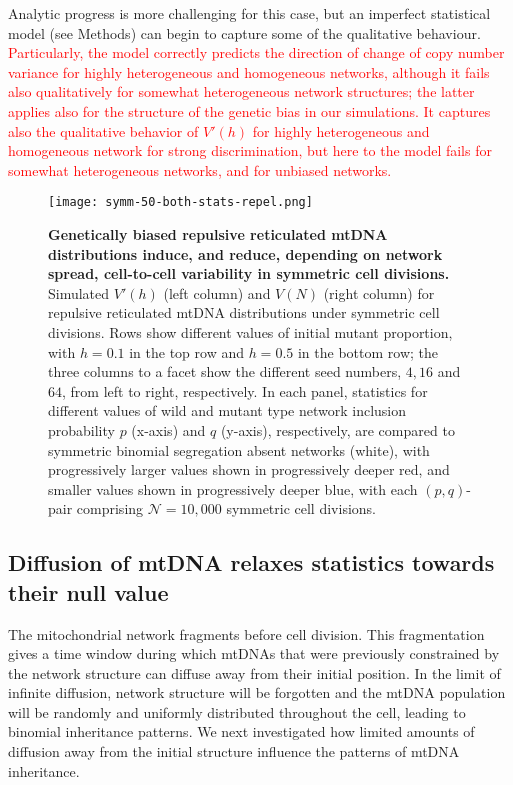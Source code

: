 \documentclass{article}
\begin{document}
Analytic progress is more challenging for this case, but an imperfect statistical model (see Methods) can begin to capture some of the qualitative behaviour. \textcolor{red}{Particularly, the model correctly predicts the direction of change of copy number variance for highly heterogeneous and homogeneous networks, although it fails also qualitatively for somewhat heterogeneous network structures; the latter applies also for the structure of the genetic bias in our simulations. It captures also the qualitative behavior of $V'(h)$ for highly heterogeneous and homogeneous network for strong discrimination, but here to the model fails for somewhat heterogeneous networks, and for unbiased networks.}

\begin{figure}
\centering
\texttt{[image: symm-50-both-stats-repel.png]}
\caption{\textbf{Genetically biased repulsive reticulated mtDNA distributions induce, and reduce, depending on network spread, cell-to-cell variability in symmetric cell divisions.} Simulated $V'(h)$ (left column) and $V(N)$ (right column) for repulsive reticulated mtDNA distributions under symmetric cell divisions. Rows show different values of initial mutant proportion, with $h=0.1$ in the top row and $h=0.5$ in the bottom row; the three columns to a facet show the different seed numbers, $4, 16$ and $64$, from left to right, respectively. In each panel, statistics for different values of wild and mutant type network inclusion probability $p$ (x-axis) and $q$ (y-axis), respectively, are compared to symmetric binomial segregation absent networks (white), with progressively larger values shown in progressively deeper red, and smaller values shown in progressively deeper blue, with each $(p,q)$-pair comprising $\mathcal{N}=10,000$ symmetric cell divisions.}\label{fig:sim-model-compare-rep}
\end{figure}


\subsection{Diffusion of mtDNA relaxes statistics towards their null value}
The mitochondrial network fragments before cell division. This fragmentation gives a time window during which mtDNAs that were previously constrained by the network structure can diffuse away from their initial position. In the limit of infinite diffusion, network structure will be forgotten and the mtDNA population will be randomly and uniformly distributed throughout the cell, leading to binomial inheritance patterns. We next investigated how limited amounts of diffusion away from the initial structure influence the patterns of mtDNA inheritance.
\end{document}
